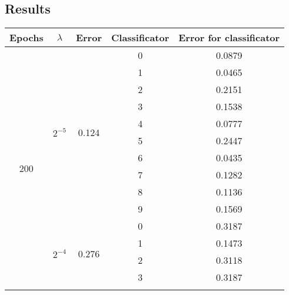 \documentclass[a4paper,12pt]{article}
\begin{document}
\subsection*{Results}
\begin{table}[h]
\begin{tabular}{ |c|c|c|c|c| }
\hline
Epochs                & $\lambda$ & Error & Classificator & Error for classificator  \\ \hline
\multirow{30}{*}{200} & \multirow{10}{*}{$2^{-5}$}              & \multirow{10}{*}{0.124} & 0 & 0.0879 \\ \cline{4-5} 
                      &                                         &                         & 1 & 0.0465 \\ \cline{4-5} 
                      &                                         &                         & 2 & 0.2151 \\ \cline{4-5} 
                      &                                         &                         & 3 & 0.1538 \\ \cline{4-5} 
                      &                                         &                         & 4 & 0.0777 \\ \cline{4-5} 
                      &                                         &                         & 5 & 0.2447 \\ \cline{4-5} 
                      &                                         &                         & 6 & 0.0435 \\ \cline{4-5} 
                      &                                         &                         & 7 & 0.1282 \\ \cline{4-5} 
                      &                                         &                         & 8 & 0.1136 \\ \cline{4-5} 
                      &                                         &                         & 9 & 0.1569 \\ \cline{2-5} 
					  &              \multirow{10}{*}{$2^{-4}$} & \multirow{10}{*}{0.276} & 0 & 0.3187 \\ \cline{4-5} 
                      &                                         &                         & 1 & 0.1473 \\ \cline{4-5} 
                      &                                         &                         & 2 & 0.3118 \\ \cline{4-5} 
                      &                                         &                         & 3 & 0.3187 \\ \cline{4-5} 

\end{tabular}
\end{table}
\end{document}
